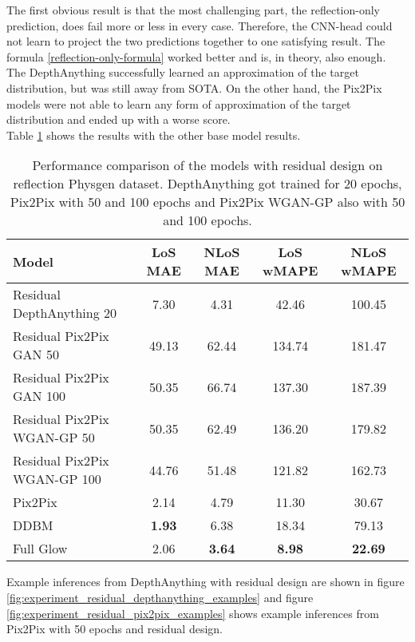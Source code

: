 		
		The first obvious result is that the most challenging part, the reflection-only prediction, does fail more or less in every case. Therefore, the CNN-head could not learn to project the two predictions together to one satisfying result. The formula \ref{reflection-only-formula} worked better and is, in theory, also enough.\\
		The DepthAnything successfully learned an approximation of the target distribution, but was still away from SOTA. On the other hand, the Pix2Pix models were not able to learn any form of approximation of the target distribution and ended up with a worse score. \\
		Table \ref{tab:experiment_residual_design_results} shows the results with the other base model results.
		\begin{table}[h!]
			\centering
			\begin{tabular}{|l|c|c|c|c|}
				\hline
				\textbf{Model} & \textbf{LoS MAE} & \textbf{NLoS MAE} & \textbf{LoS wMAPE} & \textbf{NLoS wMAPE} \\
				\hline
				Residual DepthAnything 20 & 7.30 & 4.31 & 42.46 & 100.45 \\
				Residual Pix2Pix GAN 50 & 49.13 & 62.44 & 134.74 & 181.47 \\
				Residual Pix2Pix GAN 100 & 50.35 & 66.74 & 137.30 & 187.39 \\
				Residual Pix2Pix WGAN-GP 50 & 50.35 & 62.49 & 136.20 & 179.82 \\
				Residual Pix2Pix WGAN-GP 100 & 44.76 & 51.48 & 121.82 & 162.73 \\
				Pix2Pix & 2.14 & 4.79 & 11.30 & 30.67 \\
				DDBM & \textbf{1.93} & 6.38 & 18.34 & 79.13 \\
				Full Glow & 2.06 & \textbf{3.64} & \textbf{8.98} & \textbf{22.69} \\
				\hline
			\end{tabular}
			\caption{Performance comparison of the models with residual design on reflection Physgen dataset. DepthAnything got trained for 20 epochs, Pix2Pix with 50 and 100 epochs and Pix2Pix WGAN-GP also with 50 and 100 epochs.}
			\label{tab:experiment_residual_design_results}
		\end{table}
		\FloatBarrier
		
		Example inferences from DepthAnything with residual design are shown in figure \ref{fig:experiment_residual_depthanything_examples} and figure \ref{fig:experiment_residual_pix2pix_examples} shows example inferences from Pix2Pix with 50 epochs and residual design.
		
